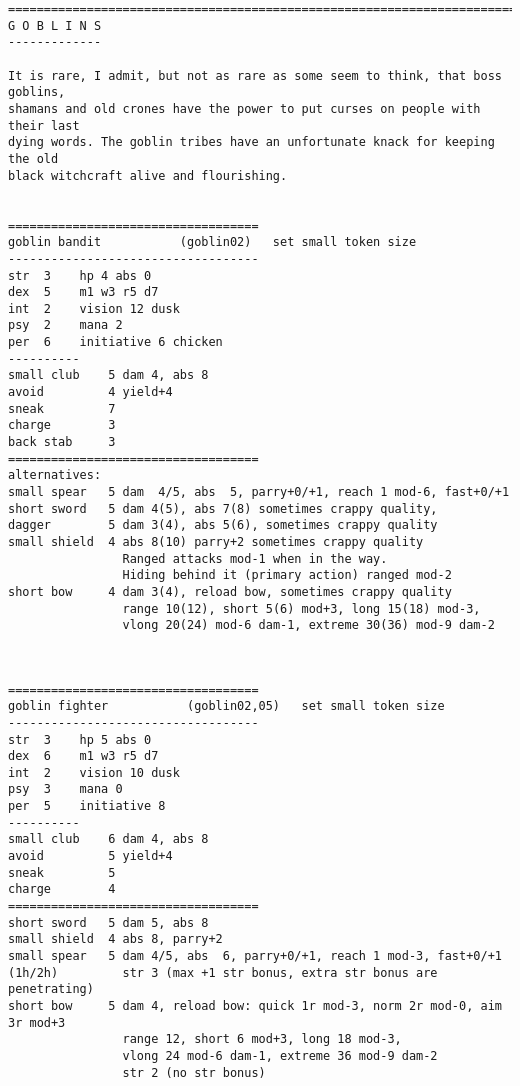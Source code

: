 \goodbreak \begin{samepage} \small \begin{verbatim}
================================================================================
G O B L I N S
-------------

It is rare, I admit, but not as rare as some seem to think, that boss goblins,
shamans and old crones have the power to put curses on people with their last
dying words. The goblin tribes have an unfortunate knack for keeping the old
black witchcraft alive and flourishing.


===================================
goblin bandit           (goblin02)   set small token size
-----------------------------------
str  3    hp 4 abs 0
dex  5    m1 w3 r5 d7
int  2    vision 12 dusk
psy  2    mana 2
per  6    initiative 6 chicken
----------
small club    5 dam 4, abs 8
avoid         4 yield+4
sneak         7
charge        3
back stab     3
===================================
alternatives:
small spear   5 dam  4/5, abs  5, parry+0/+1, reach 1 mod-6, fast+0/+1
short sword   5 dam 4(5), abs 7(8) sometimes crappy quality,
dagger        5 dam 3(4), abs 5(6), sometimes crappy quality
small shield  4 abs 8(10) parry+2 sometimes crappy quality
                Ranged attacks mod-1 when in the way.
                Hiding behind it (primary action) ranged mod-2
short bow     4 dam 3(4), reload bow, sometimes crappy quality
                range 10(12), short 5(6) mod+3, long 15(18) mod-3,
                vlong 20(24) mod-6 dam-1, extreme 30(36) mod-9 dam-2
\end{verbatim} \normalsize \end{samepage}

\

\goodbreak \begin{samepage} \small \begin{verbatim}
===================================
goblin fighter           (goblin02,05)   set small token size
-----------------------------------
str  3    hp 5 abs 0
dex  6    m1 w3 r5 d7
int  2    vision 10 dusk
psy  3    mana 0
per  5    initiative 8
----------
small club    6 dam 4, abs 8
avoid         5 yield+4
sneak         5
charge        4
===================================
short sword   5 dam 5, abs 8
small shield  4 abs 8, parry+2
small spear   5 dam 4/5, abs  6, parry+0/+1, reach 1 mod-3, fast+0/+1
(1h/2h)         str 3 (max +1 str bonus, extra str bonus are penetrating)
short bow     5 dam 4, reload bow: quick 1r mod-3, norm 2r mod-0, aim 3r mod+3
                range 12, short 6 mod+3, long 18 mod-3,
                vlong 24 mod-6 dam-1, extreme 36 mod-9 dam-2
                str 2 (no str bonus)
\end{verbatim} \normalsize \end{samepage}

